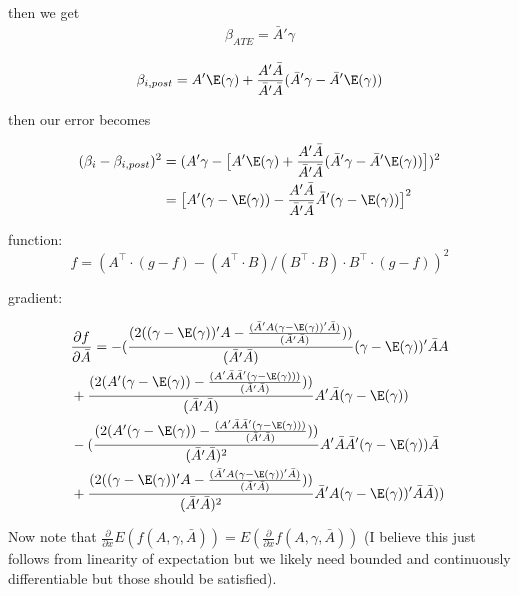 then we get 
 \begin{align*}
	\beta_{ATE} = \bar{A}' \gamma
\end{align*} 

\begin{align*}
	\beta_{i, post} = A' \E(\gamma) + \frac{A' \bar{A}}{\bar{A}' \bar{A}} (\bar{A}' \gamma - \bar{A}' \E(\gamma))
\end{align*} 

then our error becomes

\begin{align*}
	(\beta_{i} - \beta_{i, post})^2
	&= (A'\gamma - \big[A' \E(\gamma) + \frac{A' \bar{A}}{\bar{A}' \bar{A}} (\bar{A}' \gamma - \bar{A}' \E(\gamma))\big])^2 \\
	&= \big[A'(\gamma - \E(\gamma)) - \frac{A' \bar{A}}{\bar{A}' \bar{A}} \bar{A}' (\gamma - \E(\gamma))\big]^2
\end{align*} 

function:
\[
  f = (A^\top \cdot (g-f)-(A^\top \cdot B)/(B^\top \cdot B)\cdot B^\top \cdot (g-f))^{2}
\]

gradient:


\begin{align*}
	&\frac{\partial f}{\partial \bar{A}} = -(\frac{(2 ((\gamma-\E(\gamma))'  A-\frac{(\bar{A}'  A (\gamma-\E(\gamma))'  \bar{A})}{(\bar{A}'  \bar{A})}))}{(\bar{A}'  \bar{A})} (\gamma-\E(\gamma))'  \bar{A} A \\
	&+ \frac{(2 (A'  (\gamma-\E(\gamma))-\frac{(A'  \bar{A} \bar{A}'  (\gamma-\E(\gamma)))}{(\bar{A}'  \bar{A})}))}{(\bar{A}'  \bar{A})} A'  \bar{A} (\gamma-\E(\gamma)) \\
	&-(\frac{(2 (A'  (\gamma-\E(\gamma))-\frac{(A'  \bar{A} \bar{A}'  (\gamma-\E(\gamma)))}{(\bar{A}'  \bar{A})}))}{(\bar{A}'  \bar{A})^{2}} A'  \bar{A} \bar{A}'  (\gamma-\E(\gamma)) \bar{A} \\
	&+\frac{(2 ((\gamma-\E(\gamma))'  A-\frac{(\bar{A}'  A (\gamma-\E(\gamma))'  \bar{A})}{(\bar{A}'  \bar{A})}))}{(\bar{A}'  \bar{A})^{2}} \bar{A}'  A (\gamma-\E(\gamma))'  \bar{A} \bar{A}))
\end{align*} 

Now note that $\frac{\partial}{\partial x} E( f(A, \gamma, \bar{A}) ) = E(\frac{\partial}{\partial x} f(A, \gamma, \bar{A}))$ (I believe this just follows from linearity of expectation but we likely need bounded and continuously differentiable but those should be satisfied).
